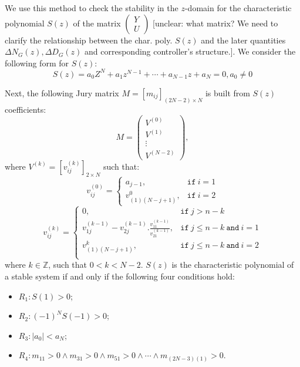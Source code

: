 \documentclass{sig-alternate-05-2015}
\newcommand{\red}[1]{{\color{red}#1}}
\begin{document}
We use this method to check the stability in the $z$-domain for the characteristic polynomial $S(z)$ of 
the matrix $\left( \begin{array}{c} Y \\ U \end{array}\right)$ \red{[unclear: what matrix? We need to clarify the relationship between the char. poly. $S(z)$ and the later quantities $\Delta N_{G}(z), \Delta D_{G}(z)$ and corresponding controller's structure.]}. 
We consider the following form for $S(z)$:
%
$$
S(z) = a_0Z^N+a_1z^{N-1}+\cdots+a_{N-1}z+a_N=0, a_0\neq0
$$
%

Next, the following Jury matrix
$M = [m_{ij}]_{(2N−2)\times N}$ is built from $S(z)$ coefficients:
%
$$
M=\left( 
\begin{array}{c}
V^{(0)}\\
V^{(1)}\\
\vdots\\
V^{(N-2)}
\end{array}
\right), 
$$
%
where $V^{(k)} = [v^{(k)}_{ij} ]_{2\times N}$ such that:
%
$$
v_{ij}^{(0)}=\left\{
\begin{array}{ll}
a_{j-1}, & \texttt{if}~i=1\\
v_{(1)(N-j+1)}^{0},&\texttt{if}~i=2
\end{array}
\right.
$$
%
$$
v_{ij}^{(k)}=\left\{
\begin{array}{ll}
0,&\texttt{if}~j>n-k\\
v_{1j}^{(k-1)}-v_{2j}^{(k-1)} . \frac{v_{11}^{(k-1)}}{v_{21}^{(k-1)}}, & \texttt{if}~j\leq n-k ~\texttt{and}~i=1\\
v_{(1)(N-j+1)}^{k},& \texttt{if}~j\leq n-k ~\texttt{and}~i=2\\
\end{array}
\right.
$$
%
where $k \in \mathbb{Z}$, such that $0 < k < N - 2$. 
$S(z)$ is the
characteristic polynomial of a stable system if and only if the following four conditions hold:
\begin{itemize}
\item $R_1: S(1) > 0$;
\item $R_2: (−1)^N S(−1) > 0$;
\item $R_3: |a_0| < a_N$;
\item $R_4: m_{11} > 0 \wedge m_{31}>0 \wedge m_{51}>0 \wedge \cdots \wedge m_{(2N{-}3)(1)}>0$.
\end{itemize}
\end{document}

